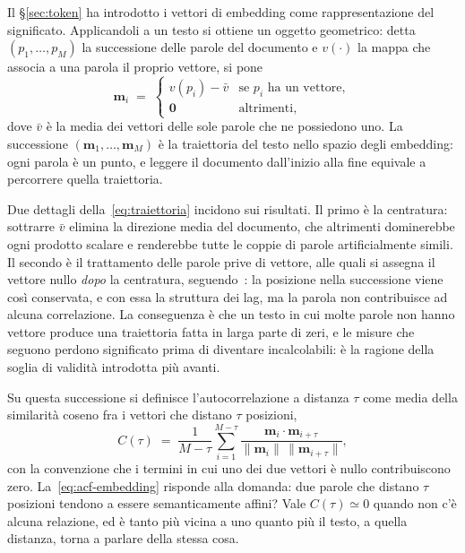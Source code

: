 Il §\ref{sec:token} ha introdotto i vettori di embedding come rappresentazione
del significato. Applicandoli a un testo si ottiene un oggetto geometrico: detta
$(p_1,\dots,p_M)$ la successione delle parole del documento e $v(\cdot)$ la
mappa che associa a una parola il proprio vettore, si pone
\begin{equation}
  \mathbf{m}_i \;=\;
  \begin{cases}
    v(p_i) - \bar{v} & \text{se $p_i$ ha un vettore},\\[2pt]
    \mathbf{0}       & \text{altrimenti},
  \end{cases}
  \label{eq:traiettoria}
\end{equation}
dove $\bar{v}$ è la media dei vettori delle sole parole che ne possiedono uno.
La successione $(\mathbf{m}_1,\dots,\mathbf{m}_M)$ è la traiettoria del testo
nello spazio degli embedding: ogni parola è un punto, e leggere il documento
dall'inizio alla fine equivale a percorrere quella traiettoria.

Due dettagli della~\eqref{eq:traiettoria} incidono sui risultati. Il primo è la
centratura: sottrarre $\bar{v}$ elimina la
direzione media del documento, che altrimenti dominerebbe ogni prodotto scalare
e renderebbe tutte le coppie di parole artificialmente simili. Il secondo è il
trattamento delle parole prive di vettore, alle quali si assegna il vettore
nullo \emph{dopo} la centratura, seguendo~\cite{mikhaylovskiy2025states}: la
posizione nella successione viene così conservata, e con essa la struttura dei
lag, ma la parola non contribuisce ad alcuna correlazione. La conseguenza è che
un testo in cui molte parole non hanno vettore produce una traiettoria fatta in
larga parte di zeri, e le misure che seguono perdono significato prima di
diventare incalcolabili: è la ragione della soglia di validità introdotta più
avanti.

Su questa successione si definisce l'autocorrelazione a distanza $\tau$ come
media della similarità coseno fra i vettori che distano $\tau$ posizioni,
\begin{equation}
  C(\tau) \;=\; \frac{1}{M-\tau} \sum_{i=1}^{M-\tau}
  \frac{\mathbf{m}_i \cdot \mathbf{m}_{i+\tau}}
       {\lVert \mathbf{m}_i \rVert \, \lVert \mathbf{m}_{i+\tau} \rVert},
  \label{eq:acf-embedding}
\end{equation}
con la convenzione che i termini in cui uno dei due vettori è nullo
contribuiscono zero. La~\eqref{eq:acf-embedding} risponde alla domanda: due
parole che distano $\tau$ posizioni tendono a essere semanticamente affini? Vale
$C(\tau) \simeq 0$ quando non c'è alcuna relazione, ed è tanto più vicina a uno
quanto più il testo, a quella distanza, torna a parlare della stessa cosa.

